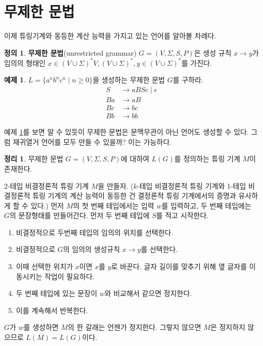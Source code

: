 \documentclass[b5paper]{book}
\theoremstyle{definition}
\newtheorem{defn}{정의}[chapter]
\newtheorem{thm}{정리}[chapter]
\newtheorem{ex}{예제}[chapter]
\newenvironment{pf*}{\pushQED{\qed}\pf}{\popQED\endpf}
\begin{document}
\section{무제한 문법}
이제 튜링기계와 동등한 계산 능력을 가지고 있는 언어를 알아볼 차례다. 
\begin{defn}
    \textbf{무제한 문법}(unrestricted grammar) $G = (V, \Sigma , S, P)$은 
    생성 규칙 $x \rightarrow y$가 임의의 형태인 $x \in (V \cup \Sigma)^* 
    V, (V \cup \Sigma)^*, y \in (V \cup \Sigma)^*$를 가진다.
\end{defn}
\begin{ex} \label{UG_ex}
    $L = \{a^n b^n c^n \;\vert\; n \ge 0\}$을 생성하는 무제한 문법 $G$를 구하라.
    \begin{align*}
        S &\rightarrow aBSc \;\vert\; \epsilon \\ 
        Ba &\rightarrow aB \\ 
        Bc &\rightarrow bc \\ 
        Bb &\rightarrow bb 
    \end{align*}
\end{ex}
예제 \ref{UG_ex}를 보면 알 수 있듯이 무제한 문법은 문맥무관이 아닌 언어도 생성할 수 있다.
그럼 재귀열거 언어를 모두 만들 수 있을까? 이는 가능하다.
\begin{thm}
    무제한 문법 $G = (V, \Sigma, S, P)$에 대하여 $L(G)$를 정의하는 튜링 기계 $M$이 존재한다.
\end{thm}
\begin{pf*}
    2-테입 비결정론적 튜링 기계 $M$을 만들자. ($k$-테입 비결정론적 튜링 기계와 
    1-테입 비결정론적 튜링 기계의 계산 능력이 동등한 건 결정론적 튜링 기계에서의 증명과
    유사하게 할 수 있다.) 먼저 $M$의 첫 번째 테입에서는 입력 $w$를 입력하고,
    두 번째 테입에는 $G$의 문장형태를 만들어간다. 먼저 두 번째 테입에
    $S$를 적고 시작한다.
    \begin{enumerate}
        \item 비결정적으로 두번째 테입의 임의의 위치를 선택한다.
        \item 비결정적으로 $G$의 임의의 생성규칙 $x \rightarrow y$를 선택한다.
        \item 이때 선택한 위치가 $x$이면 $x$를 $y$로 바꾼다. 글자 길이를
        맞추기 위해 옆 글자를 이동시키는 작업이 필요하다.
        \item 두 번째 테입에 있는 문장이 $w$와 비교해서 같으면 정지한다.
        \item 이를 계속해서 반복한다.
    \end{enumerate}
    $G$가 $w$를 생성하면 $M$의 한 갈래는 언젠가 정지한다. 그렇지 않으면
    $M$은 정지하지 않으므로 $L(M) = L(G)$이다.
\end{pf*}
\end{document}
